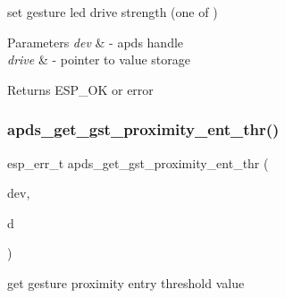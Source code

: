 \begin{DoxyItemize}
\item set gesture led drive strength (one of ) 
\end{DoxyItemize}


\begin{DoxyParams}{Parameters}
{\em dev} & -\/ apds handle \\
\hline
{\em drive} & -\/ pointer to value storage \\
\hline
\end{DoxyParams}
\begin{DoxyReturn}{Returns}
E\+S\+P\+\_\+\+OK or error 
\end{DoxyReturn}
\mbox{\label{group__APDS9960__GestureFunctions_gaea600a8b11dacef10ed4b413f7fe1f15}} 
\subsubsection{\texorpdfstring{apds\+\_\+get\+\_\+gst\+\_\+proximity\+\_\+ent\+\_\+thr()}{apds\_get\_gst\_proximity\_ent\_thr()}}
{\footnotesize\ttfamily esp\+\_\+err\+\_\+t apds\+\_\+get\+\_\+gst\+\_\+proximity\+\_\+ent\+\_\+thr (\begin{DoxyParamCaption}\item[{\hyperlink{structAPDS9960__Driver}{A\+P\+D\+S\+\_\+\+D\+EV}}]{dev,  }\item[{\hyperlink{vl53l0x__types_8h_aba7bc1797add20fe3efdf37ced1182c5}{uint8\+\_\+t} $\ast$}]{d }\end{DoxyParamCaption})}




\begin{DoxyItemize}
\item get gesture proximity entry threshold value 
\end{DoxyItemize}


